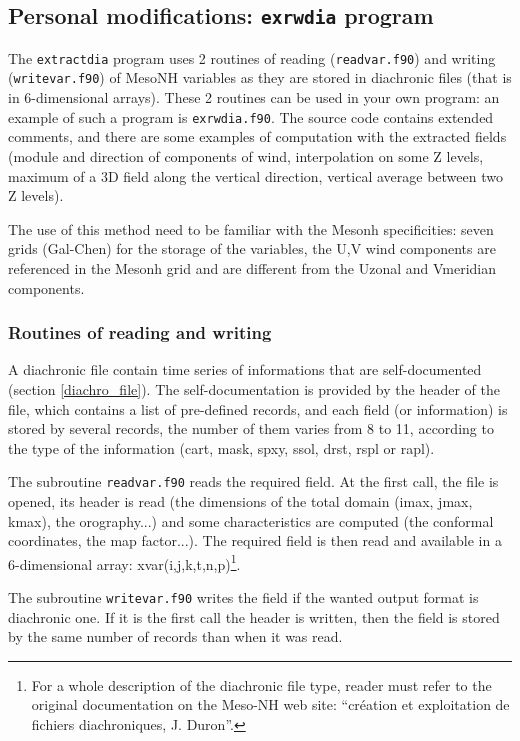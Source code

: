 \subsection{Personal modifications: \texttt{exrwdia} program}\label{exrwdia}
The \texttt{extractdia} program uses 2 routines of reading
(\texttt{readvar.f90}) and writing (\texttt{writevar.f90}) of MesoNH variables
as they are stored in diachronic files (that is in 6-dimensional arrays).
These 2 routines can be used in your own program:
an example of such a program is \texttt{exrwdia.f90}.
The source code contains extended comments,
and there are some examples of computation with the extracted fields 
(module and direction of components of wind, interpolation on some Z levels, 
maximum of a 3D field along the vertical direction, vertical average between two
Z levels). 

The use of this method need to be familiar with the Mesonh specificities:
 seven grids (Gal-Chen) for the storage of the variables, the U,V wind components are
 referenced in the Mesonh grid and are different from the Uzonal and Vmeridian
 components.

\subsubsection{Routines of reading and writing}
A diachronic file contain time series of informations that are
self-documented (section \ref{diachro_file}). 
The self-documentation is provided by the header of the file, which contains
a list of pre-defined records, and each field (or information)
is stored by several records, the number of them varies
from 8 to 11, according to the type of the information
({\sc cart, mask, spxy, ssol, drst, rspl} or {\sc rapl}).

The subroutine \texttt{readvar.f90} reads the required field. At the first call,
the file is opened, its header is read 
(the dimensions of the total domain ({\sc imax, jmax, kmax}), 
the orography...)
and some characteristics are computed
(the conformal coordinates, the map factor...).
The required field is then read and available in a 6-dimensional array: 
{\sc xvar}(i,j,k,t,n,p)\footnote{For a whole description of the diachronic file
type, reader must refer to the original documentation on the Meso-NH web site:
``{\sc cr\'eation et exploitation de fichiers diachroniques}, J. Duron''.}.

The subroutine \texttt{writevar.f90} writes the field if the wanted output
format is {\sc dia}chronic one.
If it is the first call the header is written, then
the field is stored by the same number of records than when it was read.


